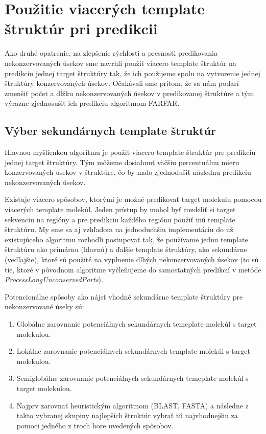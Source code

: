 \chapter{Použitie viacerých template štruktúr pri predikcii}

Ako druhé opatrenie, na zlepšenie rýchlosti a presnosti predikovania nekonzervovaných úsekov sme navrhli  použiť viacero template štruktúr na predikciu jednej target štruktúry tak, že ich použijeme spolu na vytvorenie jednej štruktúry konzervovaných úsekov. Očakávali sme pritom, že sa nám podarí zmenšiť počet a dĺžku nekonzervovaných úsekov v predikovanej štruktúre a tým výrazne zjednosušiť ich predikciu algoritmom FARFAR.

\section{Výber sekundárnych template štruktúr}
Hlavnou myšlienkou algoritmu je použiť viacero template štruktúr pre predikciu jednej target štruktúry. Tým môžeme dosiahnuť väčšiu percentuálnu mieru konzervovaných úsekov v štruktúre, čo by malo zjednodušiť následnu predikciu nekonzervovaných úsekov.


\indent  Existuje viacero spôsobov, ktorými je možné predikovať target molekulu pomocou viacerých template molekúl. Jeden prístup by mohol byť rozdeliť si target sekvenciu na regióny a pre predikciu každého regiónu použiť inú template štruktúru. My sme sa aj vzhľadom na jednoduchšiu implementáciu do už existujúceho algoritmu rozhodli postupovať tak, že používame jednu template štruktúru ako primárnu (hlavnú) a ďalšie template štruktúry, ako sekundárne (vedľajšie), ktoré sú použité na vyplnenie dlhých nekonzervovaných úsekov (to sú tie, ktoré v pôvodnom algoritme vyčleňujeme do samostatných predikcií v metóde \textit{ProcessLongUnconservedParts}).    


\indent Potencionálne spôsoby ako nájsť vhodné sekundárne template štruktúry pre nekonzervované úseky sú: 
\begin{enumerate}
\item Globálne zarovnanie potenciálnych sekundárnych temeplate molekúl s target molekulou. 
\item Lokálne zarovnanie potenciálnych sekundárnych template molekúl s target molekulou. 
\item Semiglobálne zarovnanie potenciálnych sekundárnych temeplate molekúl s target molekulou. 
\item Najprv zarovnať heuristickým algoritmom (BLAST, FASTA) \cite{BLAST} a následne z takto vybranej skupiny najlepších štruktúr vybrať tú najvhodnejšiu za pomoci jedného z troch hore uvedených spôsobov.
\end{enumerate}


